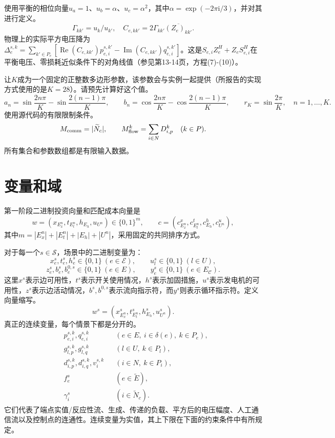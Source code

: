 \documentclass[11pt]{article}
\begin{document}
使用平衡的相位向量$u_a=1$、$u_b=\alpha$、$u_c=\alpha^2$，其中$\alpha=\exp(-2\pi\mathrm i/3)$，并对其进行定义。
\[
 \Gamma_{kk'}=u_k/u_{k'},\quad
 C_{e,kk'}=2\Gamma_{kk'}\overline{(Z_e)_{kk'}}.
\]
物理上的实际平方电压降为$\Delta_e^{s,k}=\sum_{k'\in P_e}
[\operatorname{Re}(C_{e,kk'})p_{e,i}^{s,k'}
-\operatorname{Im}(C_{e,kk'})q_{e,i}^{s,k'}]$。这是$S_{e,i}Z_e^H+Z_eS_{e,i}^H$在平衡电压、零损耗近似条件下的对角线值（参见第13-14页，方程(7)-(10)）。

让$K$成为一个固定的正整数多边形参数，该参数会与实例一起提供（所报告的实现方式使用的是$K=28$）。请预先计算好这个值。
\[
a_n=\sin\frac{2n\pi}{K}-\sin\frac{2(n-1)\pi}{K},\qquad
b_n=\cos\frac{2n\pi}{K}-\cos\frac{2(n-1)\pi}{K},\qquad
r_K=\sin\frac{2\pi}{K},\quad n=1,\ldots,K.
\]
使用源代码的有限限制条件。
\[
M_{\rm comm}=|\widetilde N_c|,\qquad
M_{\rm flow}^k=\sum_{i\in N}D_{i,p}^k\quad(k\in P).
\]
所有集合和参数数组都是有限输入数据。

\section{变量和域}
第一阶段二进制投资向量和匹配成本向量是
\[
w=(x_{E_x^n},t_{E_t^n},h_{E_h},u_{U^n})\in\{0,1\}^m,
\qquad c=(c^x_{E_x^n},c^t_{E_t^n},c^h_{E_h},c^u_{U^n}),
\]
其中$m=|E_x^n|+|E_t^n|+|E_h|+|U^n|$，采用固定的共同排序方式。

对于每一个$s\in\mathcal S$，场景中的二进制变量为：
\[
x_e^s,t_e^s,h_e^s\in\{0,1\}\ (e\in\mathcal E),\qquad
u_l^s\in\{0,1\}\ (l\in U),
\]
\[
z_e^s,b_e^s,b_e^{0,s}\in\{0,1\}\ (e\in E),\qquad
y_e^s\in\{0,1\}\ (e\in E_{\mathcal C}).
\]
这里$x^s$表示边可用性，$t^s$表示开关使用情况，$h^s$表示加固措施，$u^s$表示发电机的可用性，$z^s$表示边活动情况，$b^s,b^{0,s}$表示流向指示符，而$y^s$则表示循环指示符。定义向量缩写。
\[
w^s=(x^s_{E_x^n},t^s_{E_t^n},h^s_{E_h},u^s_{U^n}).
\]
真正的连续变量，每个情景下都是分开的。
\begin{align*}
&p_{e,i}^{s,k},q_{e,i}^{s,k} &&(e\in E,\ i\in\delta(e),\ k\in P_e),\\
&g_{l,p}^{s,k},g_{l,q}^{s,k} &&(l\in U,\ k\in P_l),\\
&d_{i,p}^{s,k},d_{i,q}^{s,k},v_i^{s,k} &&(i\in N,\ k\in P_i),\\
&f_e^s &&(e\in\widetilde E),\\
&\gamma_i^s &&(i\in\widetilde N_c).
\end{align*}
它们代表了端点实值/反应性流、生成、传递的负载、平方后的电压幅度、人工通信流以及控制点的连通性。连续变量为实值，其上下限在下面的约束条件中有所规定。
\end{document}
